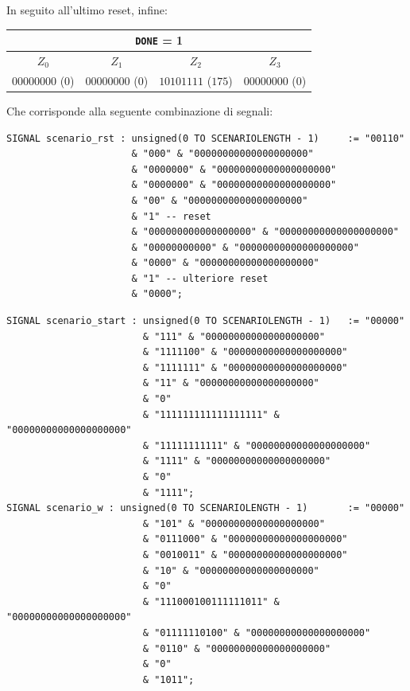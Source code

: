 \documentclass[a4paper,11pt]{article} %
\begin{document}
    \medskip

    In seguito all'ultimo reset, infine:

    \medskip

    \begin{tabular}{|c|c|c|c|}
        \hline
        \multicolumn{4}{|c|}{\texttt{DONE} = 1} \\
        \hline
        $Z_0$            & $Z_1$            & $Z_2$              & $Z_3$            \\
        \hline
        $00000000$ ($0$) & $00000000$ ($0$) & $10101111$ ($175$) & $00000000$ ($0$) \\
        \hline
    \end{tabular}

    \bigskip

    Che corrisponde alla seguente combinazione di segnali:

    \begin{verbatim}
SIGNAL scenario_rst : unsigned(0 TO SCENARIOLENGTH - 1)     := "00110"
                      & "000" & "00000000000000000000"
                      & "0000000" & "00000000000000000000"
                      & "0000000" & "00000000000000000000"
                      & "00" & "00000000000000000000"
                      & "1" -- reset
                      & "000000000000000000" & "00000000000000000000"
                      & "00000000000" & "00000000000000000000"
                      & "0000" & "00000000000000000000"
                      & "1" -- ulteriore reset
                      & "0000";
    \end{verbatim}
    \begin{verbatim}
SIGNAL scenario_start : unsigned(0 TO SCENARIOLENGTH - 1)   := "00000"
                        & "111" & "00000000000000000000"
                        & "1111100" & "00000000000000000000"
                        & "1111111" & "00000000000000000000"
                        & "11" & "00000000000000000000"
                        & "0"
                        & "111111111111111111" & "00000000000000000000"
                        & "11111111111" & "00000000000000000000"
                        & "1111" & "00000000000000000000"
                        & "0"
                        & "1111";
SIGNAL scenario_w : unsigned(0 TO SCENARIOLENGTH - 1)       := "00000"
                        & "101" & "00000000000000000000"
                        & "0111000" & "00000000000000000000"
                        & "0010011" & "00000000000000000000"
                        & "10" & "00000000000000000000"
                        & "0"
                        & "111000100111111011" & "00000000000000000000"
                        & "01111110100" & "00000000000000000000"
                        & "0110" & "00000000000000000000"
                        & "0"
                        & "1011";
    \end{verbatim}
\end{document}
